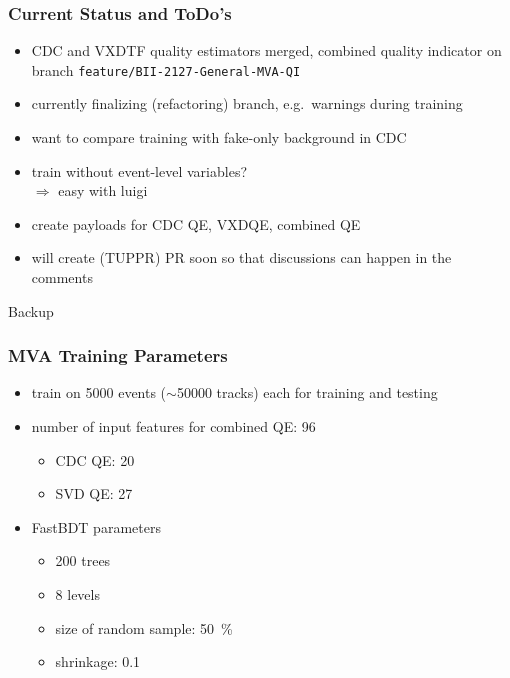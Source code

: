 \documentclass[18pt, aspectratio=169]{beamer}
\begin{document}
\begin{frame}
  \frametitle{Current Status and ToDo's}
    \begin{itemize}
    \item CDC and VXDTF quality estimators merged, combined quality indicator on branch
      \texttt{feature/BII-2127-General-MVA-QI}
    \item currently finalizing (refactoring) branch, e.g.\ warnings during training
    \item want to compare training with fake-only background in CDC
    \item train without event-level variables?\\
      $\Rightarrow$ easy with luigi
    \item create payloads for CDC QE, VXDQE, combined QE
    \item will create (TUPPR) PR soon so that discussions can happen in the comments
    \end{itemize}
\end{frame}

\appendix
\backupbegin

\begin{frame}
  \centering \huge
  Backup
\end{frame}

\begin{frame}
  \frametitle{MVA Training Parameters}
  \begin{itemize}
  \item train on \num{5000} events ($\sim$\num{50 000} tracks) each for training and testing
  \item number of input features for combined QE: 96
    \begin{itemize}
    \item CDC QE: 20
    \item SVD QE: 27
    \end{itemize}
  \item FastBDT parameters
  \begin{itemize}
    \item 200 trees
    \item 8 levels
    \item size of random sample: \SI{50}{\percent}
    \item shrinkage: \num{0.1}
    \end{itemize}
  \end{itemize}
\end{frame}
\end{document}
